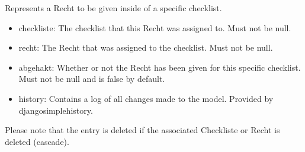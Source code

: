\documentclass[letterpaper,10pt,english]{sphinxmanual}
\begin{document}
\begin{fulllineitems}
\label{\detokenize{masterCodeDoc:checklisten.models.ChecklisteRecht}}
Represents a Recht to be given inside of a specific checklist.
\begin{itemize}
\item {} 
checkliste: The checklist that this Recht was assigned to. Must not be null.

\item {} 
recht: The Recht that was assigned to the checklist. Must not be null.

\item {} 
abgehakt: Whether or not the Recht has been given for this specific checklist. Must not be null and is false by default.

\item {} 
history: Contains a log of all changes made to the model. Provided by django\sphinxhyphen{}simple\sphinxhyphen{}history.

\end{itemize}

Please note that the entry is deleted if the associated Checkliste or Recht is deleted (cascade).

\begin{fulllineitems}
\label{\detokenize{masterCodeDoc:checklisten.models.ChecklisteRecht.DoesNotExist}}
\end{fulllineitems}


\begin{fulllineitems}
\label{\detokenize{masterCodeDoc:checklisten.models.ChecklisteRecht.MultipleObjectsReturned}}
\end{fulllineitems}



\end{fulllineitems}
\end{document}
